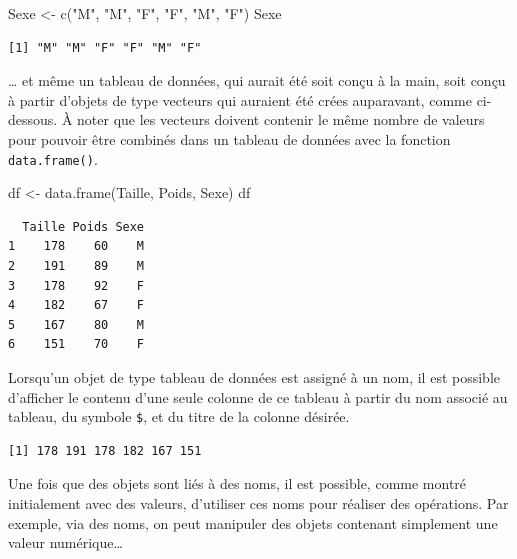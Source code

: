 \documentclass[
  letterpaper,
]{book}
\newenvironment{Shaded}{\begin{snugshade}}{\end{snugshade}}
\newcommand{\FunctionTok}[1]{\textcolor[rgb]{0.28,0.35,0.67}{#1}}
\newcommand{\NormalTok}[1]{\textcolor[rgb]{0.00,0.23,0.31}{#1}}
\newcommand{\OtherTok}[1]{\textcolor[rgb]{0.00,0.23,0.31}{#1}}
\newcommand{\SpecialCharTok}[1]{\textcolor[rgb]{0.37,0.37,0.37}{#1}}
\newcommand{\StringTok}[1]{\textcolor[rgb]{0.13,0.47,0.30}{#1}}
\begin{document}
\begin{Shaded}
\begin{Highlighting}[]
\NormalTok{Sexe }\OtherTok{\textless{}{-}} \FunctionTok{c}\NormalTok{(}\StringTok{"M"}\NormalTok{, }\StringTok{"M"}\NormalTok{, }\StringTok{"F"}\NormalTok{, }\StringTok{"F"}\NormalTok{, }\StringTok{"M"}\NormalTok{, }\StringTok{"F"}\NormalTok{)}
\NormalTok{Sexe}
\end{Highlighting}
\end{Shaded}

\begin{verbatim}
[1] "M" "M" "F" "F" "M" "F"
\end{verbatim}

\ldots{} et même un tableau de données, qui aurait été soit conçu à la
main, soit conçu à partir d'objets de type vecteurs qui auraient été
crées auparavant, comme ci-dessous. À noter que les vecteurs doivent
contenir le même nombre de valeurs pour pouvoir être combinés dans un
tableau de données avec la fonction \texttt{data.frame()}.

\begin{Shaded}
\begin{Highlighting}[]
\NormalTok{df }\OtherTok{\textless{}{-}} \FunctionTok{data.frame}\NormalTok{(Taille, Poids, Sexe)}
\NormalTok{df}
\end{Highlighting}
\end{Shaded}

\begin{verbatim}
  Taille Poids Sexe
1    178    60    M
2    191    89    M
3    178    92    F
4    182    67    F
5    167    80    M
6    151    70    F
\end{verbatim}

Lorsqu'un objet de type tableau de données est assigné à un nom, il est
possible d'afficher le contenu d'une seule colonne de ce tableau à
partir du nom associé au tableau, du symbole \texttt{\$}, et du titre de
la colonne désirée.

\begin{Shaded}
\end{Shaded}

\begin{verbatim}
[1] 178 191 178 182 167 151
\end{verbatim}

Une fois que des objets sont liés à des noms, il est possible, comme
montré initialement avec des valeurs, d'utiliser ces noms pour réaliser
des opérations. Par exemple, via des noms, on peut manipuler des objets
contenant simplement une valeur numérique\ldots{}
\end{document}
